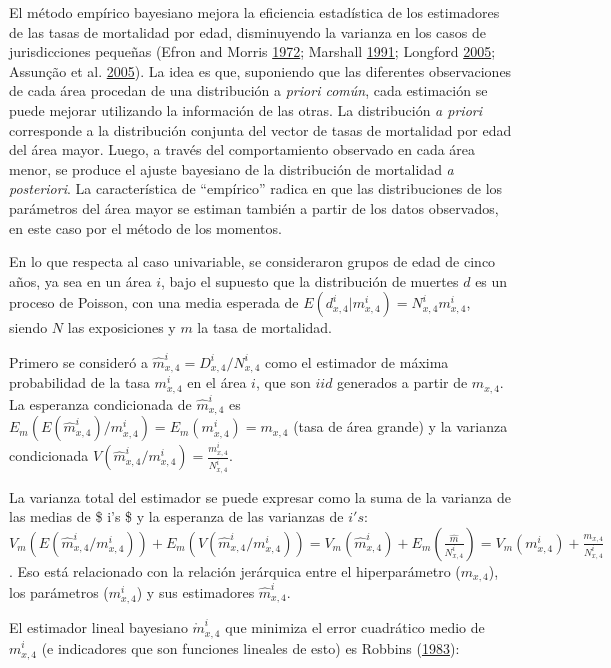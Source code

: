 \documentclass[12pt,]{article}
\begin{document}
El método empírico bayesiano mejora la eficiencia estadística de los
estimadores de las tasas de mortalidad por edad, disminuyendo la
varianza en los casos de jurisdicciones pequeñas (Efron and Morris
\protect\hyperlink{ref-Efron1972}{1972}; Marshall
\protect\hyperlink{ref-Marshall1991}{1991}; Longford
\protect\hyperlink{ref-Longford2005}{2005}; Assunção et al.
\protect\hyperlink{ref-Assuncao2005}{2005}). La idea es que, suponiendo
que las diferentes observaciones de cada área procedan de una
distribución a \emph{priori común}, cada estimación se puede mejorar
utilizando la información de las otras. La distribución \emph{a priori}
corresponde a la distribución conjunta del vector de tasas de mortalidad
por edad del área mayor. Luego, a través del comportamiento observado en
cada área menor, se produce el ajuste bayesiano de la distribución de
mortalidad \emph{a posteriori}. La característica de ``empírico'' radica
en que las distribuciones de los parámetros del área mayor se estiman
también a partir de los datos observados, en este caso por el método de
los momentos.

En lo que respecta al caso univariable, se consideraron grupos de edad
de cinco años, ya sea en un área \(i\), bajo el supuesto que la
distribución de muertes \(d\) es un proceso de Poisson, con una media
esperada de \(E(d_ {x,4}^{i}|{m_{x,4}^{i}})=N_{x,4}^{i}m_{x,4}^{i}\),
siendo \(N\) las exposiciones y \(m\) la tasa de mortalidad.

Primero se consideró a \(\hat{m}_{x,4}^{i}=D_{x,4}^{i}/N_{x,4}^{i}\)
como el estimador de máxima probabilidad de la tasa \(m_{x,4}^{i}\) en
el área \(i\), que son \(iid\) generados a partir de \(m_{x,4}\). La
esperanza condicionada de \(\hat{m}_{x,4}^{i}\) es
\(E_{m}(E({\hat{m}}_{x,4}^{i})/m_{x,4}^{i})=E_{m}({m_{x, 4}^{i}}) = m_{x,4}\)
(tasa de área grande) y la varianza condicionada
\(V({\hat{m}}_{x,4}^{i}/m_{x,4}^{i})=\frac{m_{x,4}^{i}}{N_{x,4}^{i}}\).

La varianza total del estimador se puede expresar como la suma de la
varianza de las medias de \$ i's \$ y la esperanza de las varianzas de
\(i's\):
\(V_{m}(E(\hat{m}_{x,4}^{i}/m_{x,4}^{i}))+E_{m}(V({\hat{m}}_{x,4}^ {i}/m_{x,4}^{i}))=V_{m}(\hat{m}_{x,4}^{i})+E_{m}(\frac{{\hat{m}}}{N_{x,4}^{i}})=V_{m}(m_{x,4}^{i})+\frac{m_{x, 4}}{N_{x,4}^{i}}\).
Eso está relacionado con la relación jerárquica entre el hiperparámetro
(\(m_{x, 4}\)), los parámetros (\(m_{x,4}^{i}\)) y sus estimadores
\(\hat{m}_{x,4}^{i}\).

El estimador lineal bayesiano \(\mathring{m}_{x, 4}^{i}\) que minimiza
el error cuadrático medio de \({m}_{x,4}^{i}\) (e indicadores que son
funciones lineales de esto) es Robbins
(\protect\hyperlink{ref-Robbins1983}{1983}):
\end{document}
